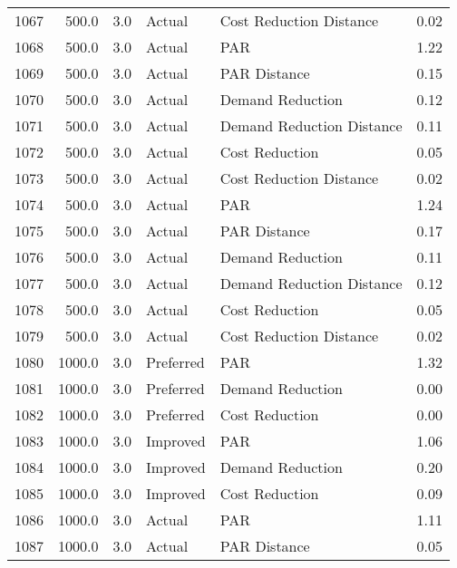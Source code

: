\begin{longtable}{lrrllr}
1067 &        500.0 &     3.0 &         Actual &    Cost Reduction Distance &   0.02 \\
1068 &        500.0 &     3.0 &         Actual &                        PAR &   1.22 \\
1069 &        500.0 &     3.0 &         Actual &               PAR Distance &   0.15 \\
1070 &        500.0 &     3.0 &         Actual &           Demand Reduction &   0.12 \\
1071 &        500.0 &     3.0 &         Actual &  Demand Reduction Distance &   0.11 \\
1072 &        500.0 &     3.0 &         Actual &             Cost Reduction &   0.05 \\
1073 &        500.0 &     3.0 &         Actual &    Cost Reduction Distance &   0.02 \\
1074 &        500.0 &     3.0 &         Actual &                        PAR &   1.24 \\
1075 &        500.0 &     3.0 &         Actual &               PAR Distance &   0.17 \\
1076 &        500.0 &     3.0 &         Actual &           Demand Reduction &   0.11 \\
1077 &        500.0 &     3.0 &         Actual &  Demand Reduction Distance &   0.12 \\
1078 &        500.0 &     3.0 &         Actual &             Cost Reduction &   0.05 \\
1079 &        500.0 &     3.0 &         Actual &    Cost Reduction Distance &   0.02 \\
1080 &       1000.0 &     3.0 &      Preferred &                        PAR &   1.32 \\
1081 &       1000.0 &     3.0 &      Preferred &           Demand Reduction &   0.00 \\
1082 &       1000.0 &     3.0 &      Preferred &             Cost Reduction &   0.00 \\
1083 &       1000.0 &     3.0 &       Improved &                        PAR &   1.06 \\
1084 &       1000.0 &     3.0 &       Improved &           Demand Reduction &   0.20 \\
1085 &       1000.0 &     3.0 &       Improved &             Cost Reduction &   0.09 \\
1086 &       1000.0 &     3.0 &         Actual &                        PAR &   1.11 \\
1087 &       1000.0 &     3.0 &         Actual &               PAR Distance &   0.05 \\

\end{longtable}
